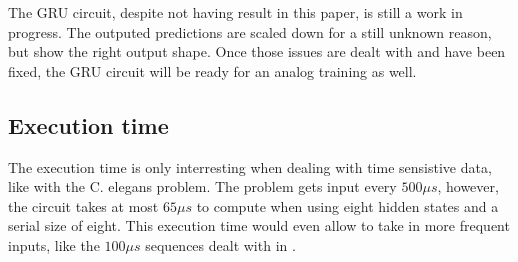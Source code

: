 The \ac{GRU} circuit, despite not having result in this paper, is still a work in progress. The outputed predictions are scaled down for a still unknown reason, but show the right output shape. Once those issues are dealt with and have been fixed, the \ac{GRU} circuit will be ready for an analog training as well.

\subsection{Execution time}

The execution time is only interresting when dealing with time sensistive data, like with the C. elegans problem. The problem gets input every $500\mu s$, however, the circuit takes at most $65\mu s$ to compute when using eight hidden states and a serial size of eight. This execution time would even allow to take in more frequent inputs, like the $100\mu s$ sequences dealt with in \cite{celegans}.
